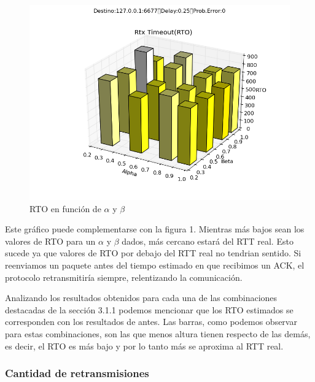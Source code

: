\begin{figure}[H]
  \centering	
	\includegraphics[scale=0.5]{../analisis/graficos_tablas/graficos_en_funcion_de_alfa_y_beta/graficos/rto.png}
  \caption{RTO en funci\'on de $\alpha$ y $\beta$}
	\label{fig:histo-src-sitiotrabajo}
\end{figure}

Este gr\'afico puede complementarse con la figura 1. Mientras m\'as bajos sean los valores de RTO para un $\alpha$ y $\beta$ dados, m\'as cercano estar\'a del RTT real. Esto sucede ya que valores de RTO por debajo del RTT real no tendrian sentido. Si reenviamos un paquete antes del tiempo estimado en que recibimos un ACK, el protocolo retransmitir\'ia siempre, relentizando la comunicaci\'on.

Analizando los resultados obtenidos para cada una de las combinaciones destacadas de la secci\'on 3.1.1 podemos mencionar que los RTO estimados se corresponden con los resultados de antes. Las barras, como podemos observar para estas combinaciones, son las que menos altura tienen respecto de las dem\'as, es decir, el RTO es m\'as bajo y por lo tanto m\'as se aproxima al RTT real.

\subsubsection{Cantidad de retransmisiones}

